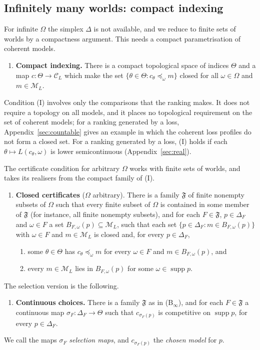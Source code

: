 \documentclass[11pt]{article}
\theoremstyle{definition}
\theoremstyle{remark}
\newcommand{\M}{\mathcal M}
\newcommand{\C}{\mathcal C}
\newcommand{\F}{\mathfrak F}
\newcommand{\supp}{\operatorname{supp}}
\begin{document}
\subsection{Infinitely many worlds: compact indexing}\label{sec:infinite-axioms}
For infinite $\Omega$ the simplex $\Delta$ is not available, and we reduce to finite sets of worlds by a compactness argument. This needs a compact parametrisation of coherent models.
\begin{enumerate}[label=\textbf{(I)},leftmargin=*]
\item \textbf{Compact indexing.} There is a compact topological space of indices $\Theta$ and a map $c:\Theta\to\C_L$ which make the set $\{\theta\in\Theta:c_\theta\preceq_\omega m\}$ closed for all $\omega\in\Omega$ and $m\in\M_L$.
\end{enumerate}
Condition (I) involves only the comparisons that the ranking makes. It does not require a topology on all models, and it places no topological requirement on the set of coherent models; for a ranking generated by a loss, Appendix~\ref{sec:countable} gives an example in which the coherent loss profiles do not form a closed set. For a ranking generated by a loss, (I) holds if each $\theta\mapsto L(c_\theta,\omega)$ is lower semicontinuous (Appendix~\ref{sec:real}).

The certificate condition for arbitrary $\Omega$ works with finite sets of worlds, and takes its realisers from the compact family of (I).
\begin{enumerate}[label=\textbf{(B$_\infty$)},leftmargin=*]
\item \textbf{Closed certificates} ($\Omega$ arbitrary). There is a family $\F$ of finite nonempty subsets of $\Omega$ such that every finite subset of $\Omega$ is contained in some member of $\F$ (for instance, all finite nonempty subsets), and for each $F\in\F$, $p\in\Delta_F$ and $\omega\in F$ a set $B_{F,\omega}(p)\subseteq\M_L$, such that each set $\{p\in\Delta_F:m\in B_{F,\omega}(p)\}$ with $\omega\in F$ and $m\in\M_L$ is closed and, for every $p\in\Delta_F$,
\begin{enumerate}[label=(\roman*)]
\item some $\theta\in\Theta$ has $c_\theta\preceq_\omega m$ for every $\omega\in F$ and $m\in B_{F,\omega}(p)$, and
\item every $m\in\M_L$ lies in $B_{F,\omega}(p)$ for some $\omega\in\supp p$.
\end{enumerate}
\end{enumerate}
The selection version is the following.
\begin{enumerate}[label=\textbf{(S$_\infty$)},leftmargin=*]
\item \textbf{Continuous choices.} There is a family $\F$ as in (B$_\infty$), and for each $F\in\F$ a continuous map $\sigma_F:\Delta_F\to\Theta$ such that $c_{\sigma_F(p)}$ is competitive on $\supp p$, for every $p\in\Delta_F$.
\end{enumerate}
We call the maps $\sigma_F$ \emph{selection maps}, and $c_{\sigma_F(p)}$ the \emph{chosen model} for $p$.
\end{document}
